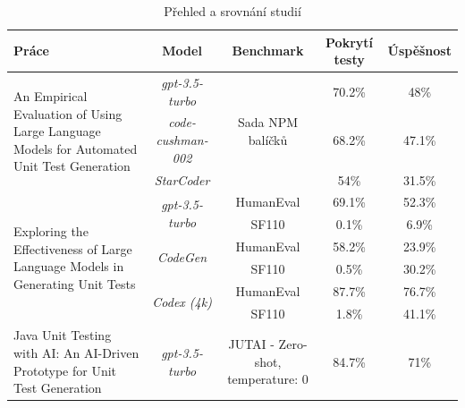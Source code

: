 \documentclass[czech, ma, kiv, he, iso690alph, pdf, viewonly]{fasthesis}
\begin{document}
        \newpage

        \begin{landscape}
            \vspace*{\fill}
            \begin{table}[H]
                \begin{tabular}{|p{6cm}|c|c|c|c|}
                    \hline
                    \textbf{Práce} & \textbf{Model} & \textbf{Benchmark} & \textbf{Pokrytí testy} & \textbf{Úspěšnost} \\
                    \hline
                    \multirow{3}{6cm}{An Empirical Evaluation of Using Large Language Models for Automated Unit Test Generation} & \textit{gpt-3.5-turbo} & \multirow{3}{*}{Sada NPM balíčků} & 70.2\% & 48\% \\
                     & \textit{code-cushman-002} & & 68.2\% & 47.1\% \\
                     & \textit{StarCoder} & & 54\% & 31.5\% \\
                    \hline
                    \multirow{6}{6cm}{Exploring the Effectiveness of Large Language
Models in Generating Unit Tests} & \multirow{2}{*}{\textit{gpt-3.5-turbo}} & HumanEval & 69.1\% & 52.3\% \\
                     & & SF110 & 0.1\% & 6.9\% \\
                     & \multirow{2}{*}{\textit{CodeGen}} & HumanEval & 58.2\% & 23.9\% \\
                     & & SF110 & 0.5\% & 30.2\% \\
                     & \multirow{2}{*}{\textit{Codex (4k)}} & HumanEval & 87.7\% & 76.7\% \\
                     & & SF110 & 1.8\% & 41.1\% \\
                    \hline
                    Java Unit Testing with AI: An AI-Driven Prototype for Unit Test Generation & \textit{gpt-3.5-turbo} & JUTAI - Zero-shot, temperature: \(0\) & 84.7\% & 71\% \\
                    \hline
                \end{tabular}
                \centering
                \caption{Přehled a srovnání studií}
                \label{tab:paper_comp}
            \end{table}
            \vspace*{\fill}

            \pagebreak


\end{landscape}
\end{document}
